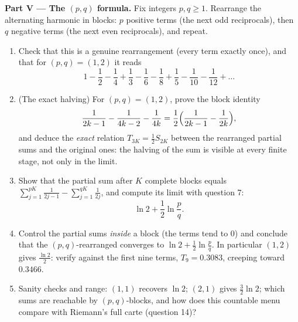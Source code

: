 \begin{problem}[{Weekend problem --- $H_n = \ln n + \gamma +
\frac{1}{2n} + O(n^{-2})$, and rearranging $1 - \frac12 +
\frac13 - \dots$ to $\frac{\ln 2}{2}$}]
\medskip
\noindent\textbf{Part V --- The $(p, q)$ formula.} Fix integers
$p, q \geq 1$. Rearrange the alternating harmonic  in
blocks: $p$ positive terms (the next odd reciprocals), then $q$
negative terms (the next even reciprocals), and repeat.
\begin{enumerate}[resume]
  \item Check that this is a genuine rearrangement (every term
        exactly once), and that for $(p, q) = (1, 2)$ it reads
        \[
        1 - \frac12 - \frac14 + \frac13 - \frac16 - \frac18 +
        \frac15 - \frac1{10} - \frac1{12} + \dots
        \]
  \item (The exact halving) For $(p, q) = (1, 2)$, prove the
        block identity
        \[
        \frac{1}{2k-1} - \frac{1}{4k-2} - \frac{1}{4k}
        = \frac12\Bigl(\frac{1}{2k-1} - \frac{1}{2k}\Bigr),
        \]
        and deduce the \emph{exact} relation $T_{3K} = \frac12
        S_{2K}$ between the rearranged partial sums and the
        original ones: the halving of the sum is visible at
        every finite stage, not only in the limit.
  \item Show that the partial sum after $K$ complete blocks
        equals $\sum_{j=1}^{pK} \frac{1}{2j-1} -
        \sum_{j=1}^{qK} \frac{1}{2j}$, and compute its limit
        with question 7:
        \[
        \ln 2 + \frac12 \ln\frac pq .
        \]
  \item Control the partial sums \emph{inside} a block (the
        terms tend to $0$) and conclude that the $(p,
        q)$-rearranged  converges to $\ln 2 + \frac12\ln
        \frac pq$. In particular $(1, 2)$ gives $\frac{\ln
        2}{2}$: verify against the first nine terms, $T_9 =
        0.3083$, creeping toward $0.3466$.
  \item Sanity checks and range: $(1,1)$ recovers $\ln 2$;
        $(2,1)$ gives $\frac32\ln 2$; which sums are reachable
        by $(p, q)$-blocks, and how does this countable menu
        compare with Riemann's full carte (question 14)?
\end{enumerate}


\end{problem}
